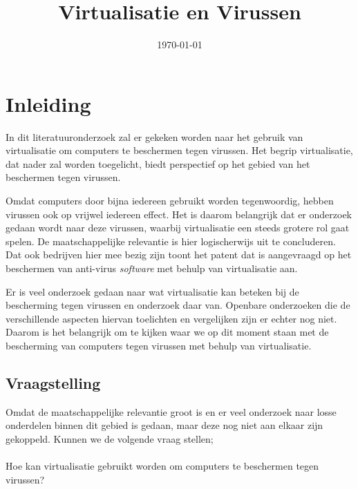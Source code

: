 \documentclass[12pt]{uva-inf-article}
\title{Virtualisatie en Virussen}
\date{\today}
\begin{document}
\maketitle



\section{Inleiding}
In dit literatuuronderzoek zal er gekeken worden naar het gebruik van
virtualisatie om computers te beschermen tegen virussen. Het begrip virtualisatie,
dat nader zal worden toegelicht, biedt perspectief op het gebied van het beschermen
tegen virussen.

Omdat computers door bijna iedereen gebruikt worden tegenwoordig, hebben virussen
ook op vrijwel iedereen effect. Het is daarom belangrijk dat er onderzoek gedaan
wordt naar deze virussen, waarbij virtualisatie een steeds grotere rol gaat spelen.
De maatschappelijke relevantie is hier logischerwijs uit te concluderen. Dat ook
bedrijven hier mee bezig zijn toont het patent dat is aangevraagd op het beschermen
van anti-virus \textit{software} met behulp van virtualisatie aan.
\cite{wang2012securing}

Er is veel onderzoek gedaan naar wat virtualisatie kan beteken bij de bescherming
tegen virussen en onderzoek daar van. Openbare onderzoeken die de verschillende
aspecten hiervan toelichten en vergelijken zijn er echter nog niet. Daarom is het belangrijk om te kijken waar we
op dit moment staan met de bescherming van computers tegen virussen met behulp
van virtualisatie.

\subsection{Vraagstelling}
Omdat de maatschappelijke relevantie groot is en er veel onderzoek naar losse
onderdelen binnen dit gebied is gedaan, maar deze nog niet aan elkaar zijn gekoppeld.
Kunnen we de volgende vraag stellen;
\\\\Hoe kan virtualisatie gebruikt worden om computers te beschermen tegen virussen?
\end{document}

